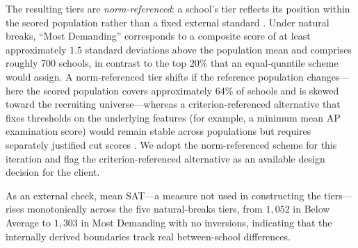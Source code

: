 The resulting tiers are \emph{norm-referenced}: a school's tier reflects its position within the
scored population rather than a fixed external standard \citep{glaser1963}. Under natural breaks,
``Most Demanding'' corresponds to a composite score of at least approximately $1.5$ standard
deviations above the population mean and comprises roughly 700 schools, in contrast to the top
20\% that an equal-quantile scheme would assign. A norm-referenced tier shifts if the reference
population changes---here the scored population covers approximately 64\% of schools and is skewed
toward the recruiting universe---whereas a criterion-referenced alternative that fixes thresholds
on the underlying features (for example, a minimum mean AP examination score) would remain stable
across populations but requires separately justified cut scores \citep{cizek2007}. We adopt the
norm-referenced scheme for this iteration and flag the criterion-referenced alternative as an
available design decision for the client.

As an external check, mean SAT---a measure not used in constructing the tiers---rises
monotonically across the five natural-breaks tiers, from $1{,}052$ in Below Average to $1{,}303$
in Most Demanding with no inversions, indicating that the internally derived boundaries track
real between-school differences.

%
%
%
%
%
